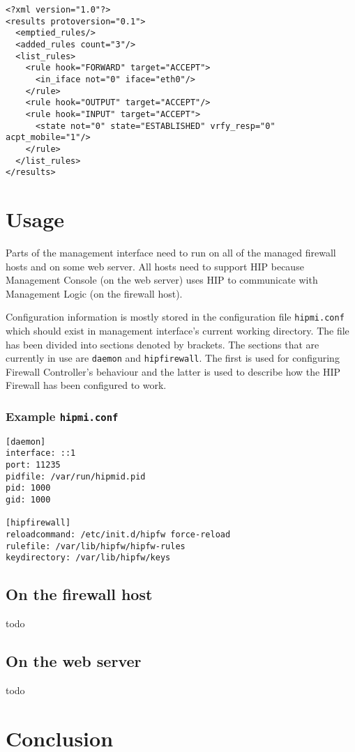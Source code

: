 \documentclass[a4paper,titlepage]{article}
\begin{document}
\begin{verbatim}
<?xml version="1.0"?>
<results protoversion="0.1">
  <emptied_rules/>
  <added_rules count="3"/>
  <list_rules>
    <rule hook="FORWARD" target="ACCEPT">
      <in_iface not="0" iface="eth0"/>
    </rule>
    <rule hook="OUTPUT" target="ACCEPT"/>
    <rule hook="INPUT" target="ACCEPT">
      <state not="0" state="ESTABLISHED" vrfy_resp="0" acpt_mobile="1"/>
    </rule>
  </list_rules>
</results>
\end{verbatim}

\section{Usage}

Parts of the management interface need to run on all of the managed
firewall hosts and on some web server. All hosts need to support HIP
because Management Console (on the web server) uses HIP to communicate
with Management Logic (on the firewall host).

Configuration information is mostly stored in the configuration file
\texttt{hipmi.conf} which should exist in management interface's
current working directory. The file has been divided into sections
denoted by brackets. The sections that are currently in use are
\texttt{daemon} and \texttt{hipfirewall}. The first is used for configuring 
Firewall Controller's behaviour and the latter is used to describe how
the HIP Firewall has been configured to work.

\subsubsection*{Example \texttt{hipmi.conf}}

\begin{verbatim}
[daemon]
interface: ::1
port: 11235
pidfile: /var/run/hipmid.pid
pid: 1000
gid: 1000

[hipfirewall]
reloadcommand: /etc/init.d/hipfw force-reload
rulefile: /var/lib/hipfw/hipfw-rules
keydirectory: /var/lib/hipfw/keys
\end{verbatim}

\subsection{On the firewall host}

todo

\subsection{On the web server}

todo

\section{Conclusion}





\appendix
\newpage
\end{document}
